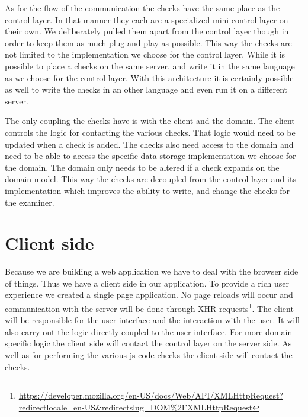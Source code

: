 As for the flow of the communication
the \glspl{check} have the same place as the control layer.
In that manner they each are a specialized mini control layer on their own.
We deliberately pulled them apart from the control layer though
in order to keep them as much plug-and-play as possible.
This way the \glspl{check} are not limited
to the implementation we choose for the control layer.
While it is possible to place a \glspl{check} on the same server,
and write it in the same language as we choose for the control layer.
With this architecture it is certainly possible as well
to write the \glspl{check} in an other language
and even run it on a different server.

The only coupling the \glspl{check} have is with the client and the domain.
The client controls the logic for contacting the various \glspl{check}.
That logic would need to be updated when a \gls{check} is added.
The \glspl{check} also need access to the domain
and need to be able to access
the specific data storage implementation we choose for the domain.
The domain only needs to be altered if a \gls{check} expands on the domain model.
This way the \glspl{check} are decoupled from the control layer
and its implementation which improves the ability to write, and change 
the \glspl{check} for the \gls{examiner}. 

\section{Client side}
Because we are building a web application
we have to deal with the browser side of things.
Thus we have a client side in our application.
To provide a rich user experience we created a single page application.
No page reloads will occur
and communication with the server will be done through
XHR requests\footnote{\url{https://developer.mozilla.org/en-US/docs/Web/API/XMLHttpRequest?redirectlocale=en-US&redirectslug=DOM\%2FXMLHttpRequest}}.
The client will be responsible for the user interface
and the interaction with the user.
It will also carry out the logic directly coupled to the user interface.
For more domain specific logic
the client side will contact the control layer on the server side.
As well as for performing the various \gls{js-code} \glspl{check}
the client side will contact the \glspl{check}.

